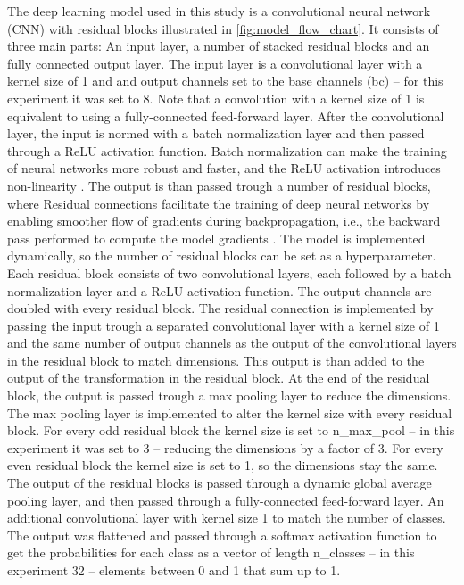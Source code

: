 The deep learning model used in this study is a convolutional neural network (CNN) with residual blocks \autocite[ResNet; ][]{heDeepResidualLearning2016}
illustrated in \autoref{fig:model_flow_chart}. It consists of three main parts: An input layer,
a number of stacked residual blocks and an fully connected output layer. The input layer is a convolutional layer with a kernel
size of 1 and and output channels set to the base channels (bc) -- for this experiment it was set to 8.
Note that a convolution with a kernel size of 1 is equivalent to using a fully-connected feed-forward layer.
After the convolutional layer, the input is normed with a batch normalization layer and then passed through
a ReLU activation function. Batch normalization can make the training of neural networks more robust and faster, 
and the ReLU activation introduces non-linearity \autocite{Goodfellow-et-al-201}.
The output is than passed trough a number of residual blocks, where
Residual connections facilitate the training of deep neural networks by enabling smoother flow of gradients 
during backpropagation, i.e., the backward pass performed to compute the model gradients \autocite{Goodfellow-et-al-201}. 
The model is implemented dynamically, so the number of residual blocks can be set as a hyperparameter. Each residual block
consists of two convolutional layers, each followed by a batch normalization layer and a ReLU activation function.
The output channels are doubled with every residual block.
The residual connection is implemented by passing the input trough a separated convolutional layer with a kernel size of 1
and the same number of output channels as the output of the convolutional layers in the residual block to
match dimensions. This output is than added to the output of the transformation in the residual block.
At the end of the residual block, the output is passed trough a max pooling layer to reduce the dimensions.
The max pooling layer is implemented to alter the kernel size with every residual block. For every odd residual block
the kernel size is set to n\_max\_pool -- in this experiment it was set to 3 -- reducing the dimensions by a factor of 3.
For every even residual block the kernel size is set to 1, so the dimensions stay the same. The output of the residual blocks
is passed through a dynamic global average pooling layer, and then passed through a fully-connected feed-forward layer. An additional
convolutional layer with kernel size 1 to match the number of classes. The output was flattened and passed through a 
softmax activation function to get the probabilities for each class as a vector of length 
n\_classes -- in this experiment 32 -- elements between 0 and 1 that sum up to 1.

